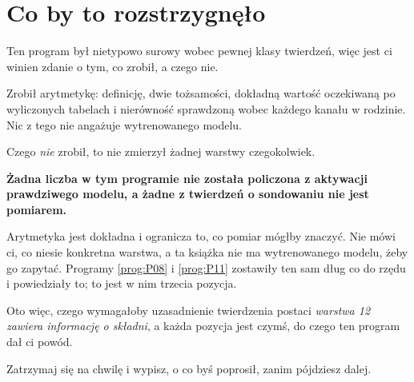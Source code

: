 \section{Co by to rozstrzygnęło}
\label{sec:P31-notmeasured}

\begin{fr}
Ten program był nietypowo surowy wobec pewnej klasy twierdzeń, więc jest ci
winien zdanie o tym, co zrobił, a czego nie.

Zrobił arytmetykę: definicję, dwie tożsamości, dokładną wartość oczekiwaną
po wyliczonych tabelach i nierówność sprawdzoną wobec każdego kanału w
rodzinie. Nic z tego nie angażuje wytrenowanego modelu.

Czego \emph{nie} zrobił, to nie zmierzył żadnej warstwy czegokolwiek.

\begin{warning}
\textbf{Żadna liczba w tym programie nie została policzona z aktywacji
prawdziwego modelu, a żadne z twierdzeń o sondowaniu nie jest pomiarem.}

Arytmetyka jest dokładna i ogranicza to, co pomiar mógłby znaczyć. Nie mówi
ci, co niesie konkretna warstwa, a ta książka nie ma wytrenowanego modelu,
żeby go zapytać. Programy \ref{prog:P08} i \ref{prog:P11} zostawiły ten sam
dług co do rzędu i powiedziały to; to jest w nim trzecia pozycja.
\end{warning}
\end{fr}

\begin{fr}
Oto więc, czego wymagałoby uzasadnienie twierdzenia postaci \emph{warstwa 12
zawiera informację o składni}, a każda pozycja jest czymś, do czego ten
program dał ci powód.

Zatrzymaj się na chwilę i wypisz, o co byś poprosił, zanim pójdziesz dalej.
\dotline
\nextframe
\end{fr}

